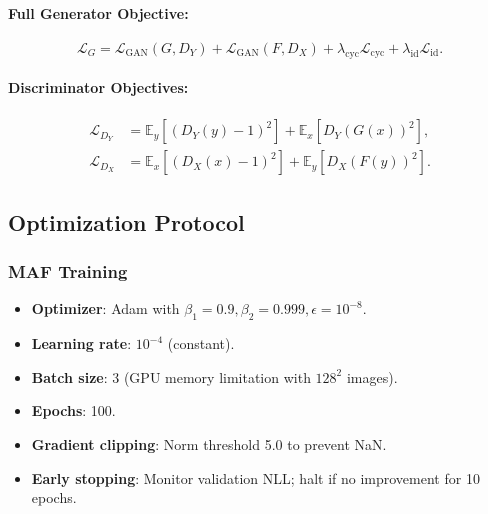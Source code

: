 \documentclass[11pt]{article}
\begin{document}
\paragraph{Full Generator Objective:}
\begin{equation}
\mathcal{L}_G = \mathcal{L}_{\text{GAN}}(G, D_Y) + \mathcal{L}_{\text{GAN}}(F, D_X) + \lambda_{\text{cyc}} \mathcal{L}_{\text{cyc}} + \lambda_{\text{id}} \mathcal{L}_{\text{id}}.
\end{equation}

\paragraph{Discriminator Objectives:}
\begin{align}
\mathcal{L}_{D_Y} &= \mathbb{E}_{y}[(D_Y(y) - 1)^2] + \mathbb{E}_{x}[D_Y(G(x))^2], \\
\mathcal{L}_{D_X} &= \mathbb{E}_{x}[(D_X(x) - 1)^2] + \mathbb{E}_{y}[D_X(F(y))^2].
\end{align}

\subsection{Optimization Protocol}
\subsubsection{MAF Training}
\begin{itemize}
\item \textbf{Optimizer}: Adam with $\beta_1=0.9, \beta_2=0.999, \epsilon=10^{-8}$.
\item \textbf{Learning rate}: $10^{-4}$ (constant).
\item \textbf{Batch size}: 3 (GPU memory limitation with $128^2$ images).
\item \textbf{Epochs}: 100.
\item \textbf{Gradient clipping}: Norm threshold 5.0 to prevent NaN.
\item \textbf{Early stopping}: Monitor validation NLL; halt if no improvement for 10 epochs.
\end{itemize}
\end{document}
